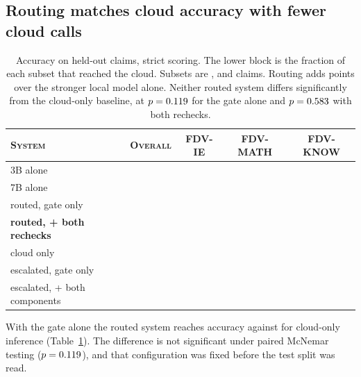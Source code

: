 \documentclass{article}
\begin{document}
\subsection{Routing matches cloud accuracy with fewer cloud calls}
\label{sec:headline}

\begin{table}[t]
\caption{Accuracy on \nTest{} held-out claims, strict scoring. The lower block is the
fraction of each subset that reached the cloud. Subsets are \nIE{}, \nMATH{} and \nKNOW{}
claims. Routing adds \gainOverSevenB{} points over the stronger local model alone. Neither
routed system differs significantly from the cloud-only baseline, at
$p = 0.119{}$ for the gate alone and $p = 0.583{}$ with both rechecks.}
\label{tab:accuracy}
\centering
\begin{tabular}{lcccc}
\toprule
\textsc{System} & \textsc{Overall} & \textsc{FDV-IE} & \textsc{FDV-MATH} & \textsc{FDV-KNOW} \\
\midrule
3B alone                     & \accThreeB{}        & \accThreeBIE{}        & \accThreeBMATH{}        & \accThreeBKNOW{} \\
7B alone                     & \accSevenB{}        & \accSevenBIE{}        & \accSevenBMATH{}        & \accSevenBKNOW{} \\
routed, gate only            & \accRouted{}        & \accRoutedIE{}        & \accRoutedMATH{}        & \accRoutedKNOW{} \\
\textbf{routed, + both rechecks} & \textbf{\accFull{}} & \textbf{\accFullIE{}} & \textbf{\accFullMATH{}} & \textbf{\accFullKNOW{}} \\
cloud only                   & \accCloud{}         & \accCloudIE{}         & \accCloudMATH{}         & \accCloudKNOW{} \\
\midrule
escalated, gate only         & \escRate{}          & \escRateIE{}          & \escRateMATH{}          & \escRateKNOW{} \\
escalated, + both components & \fullEscRate{}      & \fullEscRateIE{}      & \fullEscRateMATH{}      & \fullEscRateKNOW{} \\
\bottomrule
\end{tabular}
\end{table}

With the gate alone the routed system reaches \accRouted{} accuracy against \accCloud{} for cloud-only inference (Table~\ref{tab:accuracy}). The difference is not significant under paired McNemar testing ($p = 0.119{}$), and that configuration was fixed before the test split was read.
\end{document}
